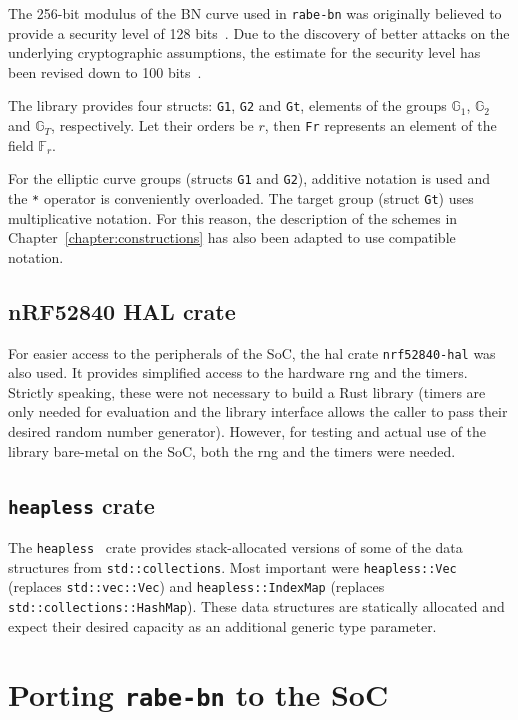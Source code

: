 The 256-bit modulus of the BN curve used in \texttt{rabe-bn} was originally believed to provide a security level of 128 bits~\cite{ben-sasson_succinct_2013}. 
Due to the discovery of better attacks on the underlying cryptographic assumptions, the estimate for the security level has been revised down to 100 bits~\cite{yonezawa_pairing-friendly_2019}.

The library provides four structs: \texttt{G1}, \texttt{G2} and \texttt{Gt}, elements of the groups $\mathbb{G}_1$, $\mathbb{G}_2$ and $\mathbb{G}_T$, respectively.
Let their orders be $r$, then \texttt{Fr} represents an element of the field $\mathbb{F}_r$.

For the elliptic curve groups (structs \texttt{G1} and \texttt{G2}), additive notation is used and the \texttt{*} operator is conveniently overloaded.
The target group (struct \texttt{Gt}) uses multiplicative notation.
For this reason, the description of the schemes in Chapter~\ref{chapter:constructions} has also been adapted to use compatible notation.

\subsection*{nRF52840 HAL crate}
For easier access to the peripherals of the SoC, the \acrfull{hal} \gls{crate} \texttt{nrf52840-hal} was also used.
It provides simplified access to the hardware \acrfull{rng} and the timers.
Strictly speaking, these were not necessary to build a Rust library (timers are only needed for evaluation and the library interface allows the caller to pass their desired random number generator).
However, for testing and actual use of the library bare-metal on the SoC, both the \acrshort{rng} and the timers were needed. %

\subsection*{\texttt{heapless} crate}
The \texttt{heapless}~\cite{aparicio_heapless_nodate} crate provides stack-allocated versions of some of the data structures from \texttt{std::collections}. 
Most important were \texttt{heapless::Vec} (replaces \texttt{std::vec::Vec}) and \texttt{heapless::IndexMap} (replaces \texttt{std::collections::HashMap}).
These data structures are statically allocated and expect their desired capacity as an additional generic type parameter.

\section{Porting \texttt{rabe-bn} to the SoC}

